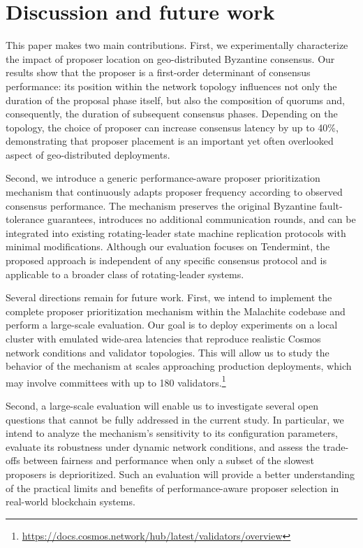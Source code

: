 \section{Discussion and future work}
\label{sec:conclusion}

This paper makes two main contributions. 
First, we experimentally characterize the impact of proposer location on geo-distributed Byzantine consensus. 
Our results show that the proposer is a first-order determinant of consensus performance: its position within the network topology influences not only the duration of the proposal phase itself, but also the composition of quorums and, consequently, the duration of subsequent consensus phases. 
Depending on the topology, the choice of proposer can increase consensus latency by up to 40\%, demonstrating that proposer placement is an important yet often overlooked aspect of geo-distributed deployments.

Second, we introduce a generic performance-aware proposer prioritization mechanism that continuously adapts proposer frequency according to observed consensus performance. 
The mechanism preserves the original Byzantine fault-tolerance guarantees, introduces no additional communication rounds, and can be integrated into existing rotating-leader state machine replication protocols with minimal modifications. 
Although our evaluation focuses on Tendermint, the proposed approach is independent of any specific consensus protocol and is applicable to a broader class of rotating-leader systems.

Several directions remain for future work. 
First, we intend to implement the complete proposer prioritization mechanism within the Malachite codebase and perform a large-scale evaluation. 
Our goal is to deploy experiments on a local cluster with emulated wide-area latencies that reproduce realistic Cosmos network conditions and validator topologies. 
This will allow us to study the behavior of the mechanism at scales approaching production deployments, which may involve committees with up to 180 validators.\footnote{\url{https://docs.cosmos.network/hub/latest/validators/overview}}

Second, a large-scale evaluation will enable us to investigate several open questions that cannot be fully addressed in the current study. 
In particular, we intend to analyze the mechanism's sensitivity to its configuration parameters, evaluate its robustness under dynamic network conditions, and assess the trade-offs between fairness and performance when only a subset of the slowest proposers is deprioritized. 
Such an evaluation will provide a better understanding of the practical limits and benefits of performance-aware proposer selection in real-world blockchain systems.




